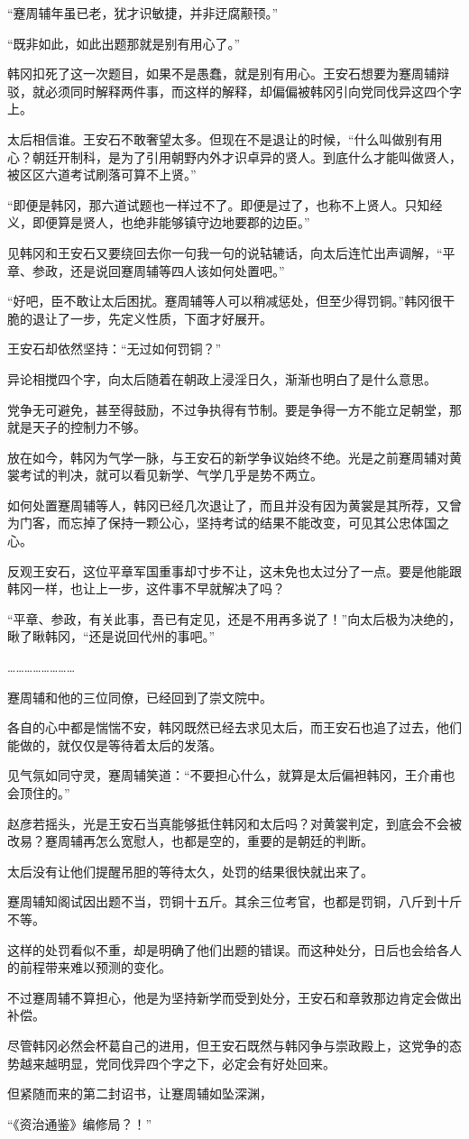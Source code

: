 “蹇周辅年虽已老，犹才识敏捷，并非迂腐颟顸。”

“既非如此，如此出题那就是别有用心了。”

韩冈扣死了这一次题目，如果不是愚蠢，就是别有用心。王安石想要为蹇周辅辩驳，就必须同时解释两件事，而这样的解释，却偏偏被韩冈引向党同伐异这四个字上。

太后相信谁。王安石不敢奢望太多。但现在不是退让的时候，“什么叫做别有用心？朝廷开制科，是为了引用朝野内外才识卓异的贤人。到底什么才能叫做贤人，被区区六道考试刷落可算不上贤。”

“即便是韩冈，那六道试题也一样过不了。即便是过了，也称不上贤人。只知经义，即便算是贤人，也绝非能够镇守边地要郡的边臣。”

见韩冈和王安石又要绕回去你一句我一句的说轱辘话，向太后连忙出声调解，“平章、参政，还是说回蹇周辅等四人该如何处置吧。”

“好吧，臣不敢让太后困扰。蹇周辅等人可以稍减惩处，但至少得罚铜。”韩冈很干脆的退让了一步，先定义性质，下面才好展开。

王安石却依然坚持：“无过如何罚铜？”

异论相搅四个字，向太后随着在朝政上浸淫日久，渐渐也明白了是什么意思。

党争无可避免，甚至得鼓励，不过争执得有节制。要是争得一方不能立足朝堂，那就是天子的控制力不够。

放在如今，韩冈为气学一脉，与王安石的新学争议始终不绝。光是之前蹇周辅对黄裳考试的判决，就可以看见新学、气学几乎是势不两立。

如何处置蹇周辅等人，韩冈已经几次退让了，而且并没有因为黄裳是其所荐，又曾为门客，而忘掉了保持一颗公心，坚持考试的结果不能改变，可见其公忠体国之心。

反观王安石，这位平章军国重事却寸步不让，这未免也太过分了一点。要是他能跟韩冈一样，也让上一步，这件事不早就解决了吗？

“平章、参政，有关此事，吾已有定见，还是不用再多说了！”向太后极为决绝的，瞅了瞅韩冈，“还是说回代州的事吧。”

……………………

蹇周辅和他的三位同僚，已经回到了崇文院中。

各自的心中都是惴惴不安，韩冈既然已经去求见太后，而王安石也追了过去，他们能做的，就仅仅是等待着太后的发落。

见气氛如同守灵，蹇周辅笑道：“不要担心什么，就算是太后偏袒韩冈，王介甫也会顶住的。”

赵彦若摇头，光是王安石当真能够抵住韩冈和太后吗？对黄裳判定，到底会不会被改易？蹇周辅再怎么宽慰人，也都是空的，重要的是朝廷的判断。

太后没有让他们提醒吊胆的等待太久，处罚的结果很快就出来了。

蹇周辅知阁试因出题不当，罚铜十五斤。其余三位考官，也都是罚铜，八斤到十斤不等。

这样的处罚看似不重，却是明确了他们出题的错误。而这种处分，日后也会给各人的前程带来难以预测的变化。

不过蹇周辅不算担心，他是为坚持新学而受到处分，王安石和章敦那边肯定会做出补偿。

尽管韩冈必然会杯葛自己的进用，但王安石既然与韩冈争与崇政殿上，这党争的态势越来越明显，党同伐异四个字之下，必定会有好处回来。

但紧随而来的第二封诏书，让蹇周辅如坠深渊，

“《资治通鉴》编修局？！”
